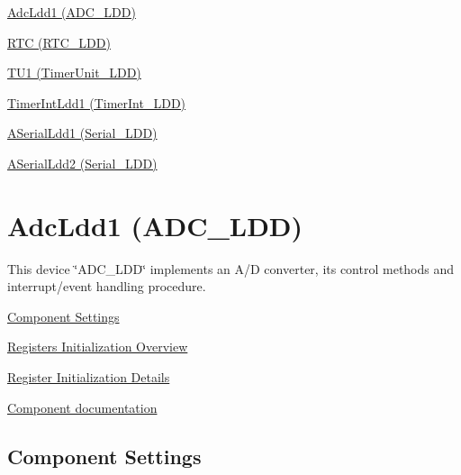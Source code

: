 
\begin{DoxyItemize}
\item \hyperlink{AdcLdd1}{Adc\+Ldd1 (A\+D\+C\+\_\+\+L\+DD)}
\item \hyperlink{RTC}{R\+TC (R\+T\+C\+\_\+\+L\+DD)}
\item \hyperlink{TU1}{T\+U1 (Timer\+Unit\+\_\+\+L\+DD)}
\item \hyperlink{TimerIntLdd1}{Timer\+Int\+Ldd1 (Timer\+Int\+\_\+\+L\+DD)}
\item \hyperlink{ASerialLdd1}{A\+Serial\+Ldd1 (Serial\+\_\+\+L\+DD)}
\item \hyperlink{ASerialLdd2}{A\+Serial\+Ldd2 (Serial\+\_\+\+L\+DD)} 
\end{DoxyItemize}\hypertarget{AdcLdd1}{}\section{Adc\+Ldd1 (A\+D\+C\+\_\+\+L\+DD)}\label{AdcLdd1}
This device \char`\"{}\+A\+D\+C\+\_\+\+L\+D\+D\char`\"{} implements an A/D converter, its control methods and interrupt/event handling procedure.


\begin{DoxyItemize}
\item \hyperlink{AdcLdd1_settings}{Component Settings}
\item \hyperlink{AdcLdd1_regs_overview}{Registers Initialization Overview}
\item \hyperlink{AdcLdd1_regs_details}{Register Initialization Details}
\item \hyperlink{group___adc_ldd1__module}{Component documentation} 
\end{DoxyItemize}\hypertarget{AdcLdd1_settings}{}\subsection{Component Settings}\label{AdcLdd1_settings}

